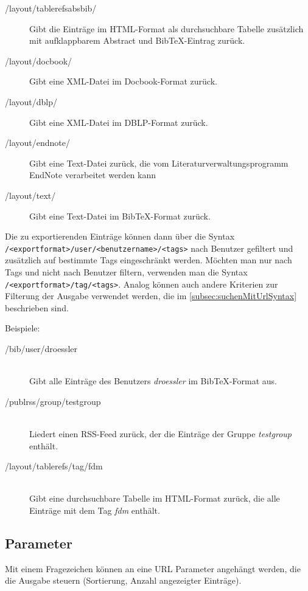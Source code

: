 \begin{itemize}
\begin{description}
  \item[/layout/tablerefsabsbib/] Gibt die Einträge im HTML-Format als durchsuchbare Tabelle zusätzlich mit aufklappbarem Abstract und BibTeX-Eintrag zurück.
  \item[/layout/docbook/] Gibt eine XML-Datei im Docbook-Format zurück.
  \item[/layout/dblp/] Gibt eine XML-Datei im DBLP-Format zurück.
  \item[/layout/endnote/] Gibt eine Text-Datei zurück, die vom Literaturverwaltungsprogramm EndNote verarbeitet werden kann
  \item[/layout/text/] Gibt eine Text-Datei im BibTeX-Format zurück.
    \end{description}
\end{itemize}

Die zu exportierenden Einträge können dann über die Syntax \texttt{/<exportformat>/user/<benutzername>/<tags>} nach Benutzer gefiltert und zusätzlich auf bestimmte Tags eingeschränkt werden. Möchten man nur nach Tags und nicht nach Benutzer filtern, verwenden man die Syntax \texttt{/<exportformat>/tag/<tags>}. Analog können auch andere Kriterien zur Filterung der Ausgabe verwendet werden, die im \autoref{subsec:suchenMitUrlSyntax} beschrieben sind.

Beispiele:
\label{subsec:volltextsuche}
\begin{description}
    \item [/bib/user/droessler] \hfill \\
    Gibt alle Einträge des Benutzers \textit{droessler} im BibTeX-Format aus.
    \item [/publrss/group/testgroup] \hfill \\
      Liedert einen RSS-Feed zurück, der die Einträge der Gruppe \textit{testgroup} enthält.
    \item [/layout/tablerefs/tag/fdm] \hfill \\
      Gibt eine durchsuchbare Tabelle im HTML-Format zurück, die alle Einträge mit dem Tag \textit{fdm} enthält. 
\end{description}

\subsection{Parameter}
\label{subsec:parameter}
Mit einem Fragezeichen können an eine URL Parameter angehängt werden, die die Ausgabe steuern (Sortierung, Anzahl angezeigter Einträge).

